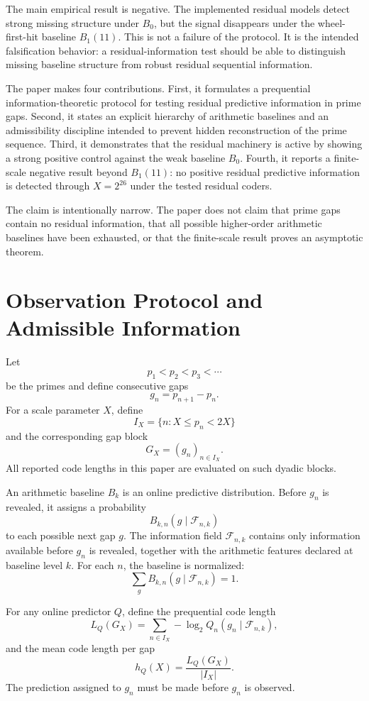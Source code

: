 \documentclass[11pt]{article}
\begin{document}
The main empirical result is negative. The implemented residual models detect strong missing structure under $B_0$, but the signal disappears under the wheel-first-hit baseline $B_1(11)$. This is not a failure of the protocol. It is the intended falsification behavior: a residual-information test should be able to distinguish missing baseline structure from robust residual sequential information.

The paper makes four contributions. First, it formulates a prequential information-theoretic protocol for testing residual predictive information in prime gaps. Second, it states an explicit hierarchy of arithmetic baselines and an admissibility discipline intended to prevent hidden reconstruction of the prime sequence. Third, it demonstrates that the residual machinery is active by showing a strong positive control against the weak baseline $B_0$. Fourth, it reports a finite-scale negative result beyond $B_1(11)$: no positive residual predictive information is detected through $X=2^{26}$ under the tested residual coders.

The claim is intentionally narrow. The paper does not claim that prime gaps contain no residual information, that all possible higher-order arithmetic baselines have been exhausted, or that the finite-scale result proves an asymptotic theorem.

\section{Observation Protocol and Admissible Information}

Let
\[
p_1<p_2<p_3<\cdots
\]
be the primes and define consecutive gaps
\[
g_n=p_{n+1}-p_n.
\]
For a scale parameter $X$, define
\[
I_X=\{n:X\leq p_n<2X\}
\]
and the corresponding gap block
\[
G_X=(g_n)_{n\in I_X}.
\]
All reported code lengths in this paper are evaluated on such dyadic blocks.

An arithmetic baseline $B_k$ is an online predictive distribution. Before $g_n$ is revealed, it assigns a probability
\[
B_{k,n}(g\mid\mathcal F_{n,k})
\]
to each possible next gap $g$. The information field $\mathcal F_{n,k}$ contains only information available before $g_n$ is revealed, together with the arithmetic features declared at baseline level $k$. For each $n$, the baseline is normalized:
\[
\sum_g B_{k,n}(g\mid\mathcal F_{n,k})=1.
\]

For any online predictor $Q$, define the prequential code length
\[
L_Q(G_X)=\sum_{n\in I_X}-\log_2 Q_n(g_n\mid\mathcal F_{n,k}),
\]
and the mean code length per gap
\[
h_Q(X)=\frac{L_Q(G_X)}{|I_X|}.
\]
The prediction assigned to $g_n$ must be made before $g_n$ is observed.
\end{document}
